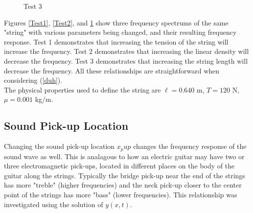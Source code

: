 \documentclass[%
 reprint,
 amsmath,amssymb,
 aps,
]{revtex4-1}
\begin{document}
\begin{figure}[h]
\caption{Test 3}
\label{Test3}
\end{figure}

Figures \ref{Test1}, \ref{Test2}, and \ref{Test3} show three frequency spectrums of the same "string" with various parameters being changed, and their resulting frequency response. Test 1 demonstrates that increasing the tension of the string will increase the frequency. Test 2 demonstrates that increasing the linear density will decrease the frequency. Test 3 demonstrates that increasing the string length will decrease the frequency. All these relationships are straightforward when considering (\ref{duh}).\\

The physical properties used to define the string are $\ell = 0.640$ m, $T = 120$ N, $\mu = 0.001$ kg/m. 





\subsection{\label{sec:level1}Sound Pick-up Location}

Changing the sound pick-up location $x_pup$ changes the frequency response of the sound wave as well. This is analagous to how an electric guitar may have two or three electromagnetic pick-ups, located in different places on the body of the guitar along the strings. Typically the bridge pick-up near the end of the strings has more "treble" (higher frequencies) and the neck pick-up closer to the center point of the strings has more "bass" (lower frequencies). This relationship was investigated using the solution of $y(x,t)$.\\
\end{document}

